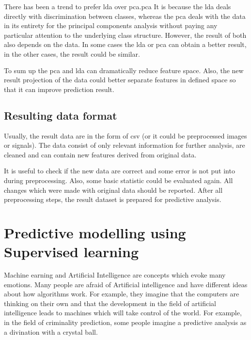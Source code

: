 \documentclass[thesis=M,english]{FITthesis}[2012/10/20]
\begin{document}
There has been a trend to prefer \gls{lda} over \gls{pca}.\gls{pca} It is because the \gls{lda} deals directly with discrimination between classes, whereas the \gls{pca} deals with the data in its entirety for the principal components analysis without paying any particular attention to the underlying class structure.\cite{Martinez2001pcalda} However, the result of both also depends on the data. In some cases the \gls{lda} or \gls{pca} can obtain a better result, in the other cases, the result could be similar. 

To sum up the \gls{pca} and \gls{lda} can dramatically reduce feature space. Also, the new result projection of the data could better separate features in defined space so that it can improve prediction result.

\section{Resulting data format}

Usually, the result data are in the form of \gls{csv} (or it could be preprocessed images or signals). The data consist of only relevant information for further analysis, are cleaned and can contain new features derived from original data.

It is useful to check if the new data are correct and some error is not put into during preprocessing. Also, some basic statistic could be evaluated again. All changes which were made with original data should be reported. After all preprocessing steps, the result dataset is prepared for predictive analysis.  


\chapter{Predictive modelling using Supervised learning}\label{sec:analysis}

Machine earning and Artificial Intelligence are concepts which evoke many emotions. Many people are afraid of Artificial intelligence and have different ideas about how algorithms work. For example, they imagine that the computers are thinking on their own and that the development in the field of artificial intelligence leads to machines which will take control of the world. For example, in the field of criminality prediction, some people imagine a predictive analysis as a divination with a crystal ball. 
\end{document}
